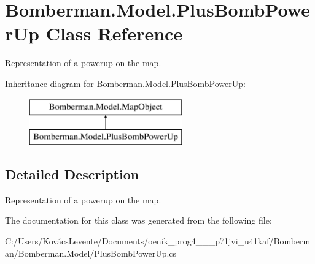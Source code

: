 \hypertarget{class_bomberman_1_1_model_1_1_plus_bomb_power_up}{}\section{Bomberman.\+Model.\+Plus\+Bomb\+Power\+Up Class Reference}
\label{class_bomberman_1_1_model_1_1_plus_bomb_power_up}


Representation of a powerup on the map.  


Inheritance diagram for Bomberman.\+Model.\+Plus\+Bomb\+Power\+Up\+:\begin{figure}[H]
\begin{center}
\leavevmode
\includegraphics[height=2.000000cm]{class_bomberman_1_1_model_1_1_plus_bomb_power_up}
\end{center}
\end{figure}


\subsection{Detailed Description}
Representation of a powerup on the map. 



The documentation for this class was generated from the following file\+:\begin{DoxyCompactItemize}
\item 
C\+:/\+Users/\+Kovács\+Levente/\+Documents/oenik\+\_\+prog4\+\_\+\_\+\_\+p71jvi\+\_\+u41kaf/\+Bomberman/\+Bomberman.\+Model/Plus\+Bomb\+Power\+Up.\+cs\end{DoxyCompactItemize}
